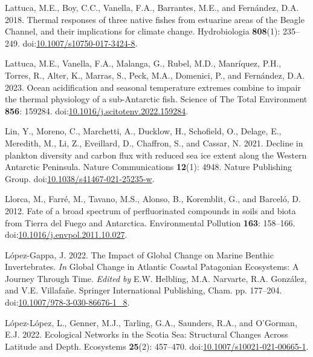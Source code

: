 \documentclass[
]{article}
\newlength{\cslhangindent}
\newenvironment{CSLReferences}[2] %
 {\begin{list}{}{%
  \setlength{\itemindent}{0pt}
  \setlength{\leftmargin}{0pt}
  \setlength{\parsep}{0pt}
  \ifodd #1
   \setlength{\leftmargin}{\cslhangindent}
   \setlength{\itemindent}{-1\cslhangindent}
  \fi
  \setlength{\itemsep}{#2\baselineskip}}}
 {\end{list}}
\begin{document}
\begin{CSLReferences}{1}{0}
Lattuca, M.E., Boy, C.C., Vanella, F.A., Barrantes, M.E., and Fernández,
D.A. 2018. Thermal responses of three native fishes from estuarine areas
of the {Beagle Channel}, and their implications for climate change.
Hydrobiologia \textbf{808}(1): 235--249.
doi:\href{https://doi.org/10.1007/s10750-017-3424-8}{10.1007/s10750-017-3424-8}.

Lattuca, M.E., Vanella, F.A., Malanga, G., Rubel, M.D., Manríquez, P.H.,
Torres, R., Alter, K., Marras, S., Peck, M.A., Domenici, P., and
Fernández, D.A. 2023. Ocean acidification and seasonal temperature
extremes combine to impair the thermal physiology of a sub-{Antarctic}
fish. Science of The Total Environment \textbf{856}: 159284.
doi:\href{https://doi.org/10.1016/j.scitotenv.2022.159284}{10.1016/j.scitotenv.2022.159284}.

Lin, Y., Moreno, C., Marchetti, A., Ducklow, H., Schofield, O., Delage,
E., Meredith, M., Li, Z., Eveillard, D., Chaffron, S., and Cassar, N.
2021. Decline in plankton diversity and carbon flux with reduced sea ice
extent along the {Western Antarctic Peninsula}. Nature Communications
\textbf{12}(1): 4948. Nature Publishing Group.
doi:\href{https://doi.org/10.1038/s41467-021-25235-w}{10.1038/s41467-021-25235-w}.

Llorca, M., Farré, M., Tavano, M.S., Alonso, B., Koremblit, G., and
Barceló, D. 2012. Fate of a broad spectrum of perfluorinated compounds
in soils and biota from {Tierra} del {Fuego} and {Antarctica}.
Environmental Pollution \textbf{163}: 158--166.
doi:\href{https://doi.org/10.1016/j.envpol.2011.10.027}{10.1016/j.envpol.2011.10.027}.

López-Gappa, J. 2022. The {Impact} of {Global Change} on {Marine Benthic
Invertebrates}. \emph{In} Global {Change} in {Atlantic Coastal
Patagonian Ecosystems}: {A Journey Through Time}. \emph{Edited by} E.W.
Helbling, M.A. Narvarte, R.A. González, and V.E. Villafañe. Springer
International Publishing, Cham. pp. 177--204.
doi:\href{https://doi.org/10.1007/978-3-030-86676-1_8}{10.1007/978-3-030-86676-1\_8}.

López-López, L., Genner, M.J., Tarling, G.A., Saunders, R.A., and
O'Gorman, E.J. 2022. Ecological {Networks} in the {Scotia Sea}:
{Structural Changes Across Latitude} and {Depth}. Ecosystems
\textbf{25}(2): 457--470.
doi:\href{https://doi.org/10.1007/s10021-021-00665-1}{10.1007/s10021-021-00665-1}.


\end{CSLReferences}
\end{document}
